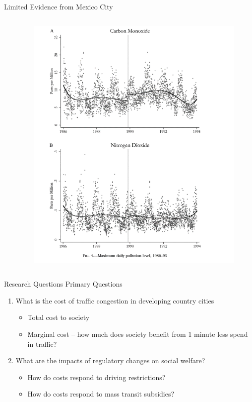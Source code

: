 \documentclass[newPxFont]{beamer}
\begin{document}
\begin{frame}[c]{Limited Evidence from Mexico City}
\begin{columns}
\begin{column}{.53\linewidth}
		\end{column}
		\begin{column}{.45\linewidth}
			\begin{figure}
				\centering
				\includegraphics[width=1.05\linewidth]{Davis_graph.png}
			\end{figure}
		\end{column}
	\end{columns}
\end{frame}

\begin{frame}[c]{Research Questions}
	Primary Questions	
	\begin{enumerate}   
		\item{What is the cost of traffic congestion in developing country cities}  
		\begin{itemize}
			\item{Total cost to society}
			\item{Marginal cost -- how much does society benefit from 1 minute less spend in traffic?}
		\end{itemize}
		\item{What are the impacts of regulatory changes on social welfare?}
		\begin{itemize}
			\item{How do costs respond to driving restrictions?}
			\item{How do costs respond to mass transit subsidies?}
		\end{itemize}
	\end{enumerate}	
\end{frame}
\end{document}
